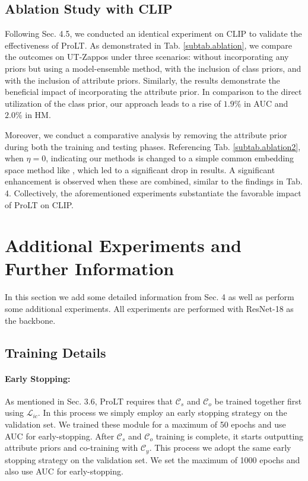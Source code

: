 \documentclass[letterpaper]{article} %
\theoremstyle{definition}
\begin{document}
\subsection{Ablation Study with CLIP}
Following Sec. 4.5, we conducted an identical experiment on CLIP to validate the effectiveness of ProLT. As demonstrated in Tab. \ref{subtab.ablation}, we compare the outcomes on UT-Zappos \cite{utzappos} under three scenarios: without incorporating any priors but using a model-ensemble method, with the inclusion of class priors, and with the inclusion of attribute priors. Similarly, the results demonstrate the beneficial impact of incorporating the attribute prior. In comparison to the direct utilization of the class prior, our approach leads to a rise of $1.9\%$ in AUC and $2.0\%$ in HM.

Moreover, we conduct a comparative analysis by removing the attribute prior during both the training and testing phases. Referencing Tab. \ref{subtab.ablation2}, when $\eta=0$, indicating our methods is changed to a simple common embedding space method like \citet{naeem2021learning}, which led to a significant drop in results. A significant enhancement is observed when these are combined, similar to the findings in Tab. 4. Collectively, the aforementioned experiments substantiate the favorable impact of ProLT on CLIP.

\section{Additional Experiments and Further Information}
In this section we add some detailed information from Sec. 4 as well as perform some additional experiments. All experiments are performed with ResNet-18 \cite{resnet} as the backbone.
\subsection{Training Details}
\paragraph{Early Stopping:} 
As mentioned in Sec. 3.6, ProLT requires that $\mathcal{C}_{s}$ and $\mathcal{C}_{o}$ be trained together first using $\mathcal{L}_{ic}$. In this process we simply employ an early stopping strategy on the validation set. We trained these module for a maximum of 50 epochs and use AUC for early-stopping. After $\mathcal{C}_{s}$ and $\mathcal{C}_{o}$ training is complete, it starts outputting attribute priors and co-training with $\mathcal{C}_y$. This process we adopt the same early stopping strategy on the validation set. We set the maximum of 1000 epochs and also use AUC for early-stopping.
\end{document}
